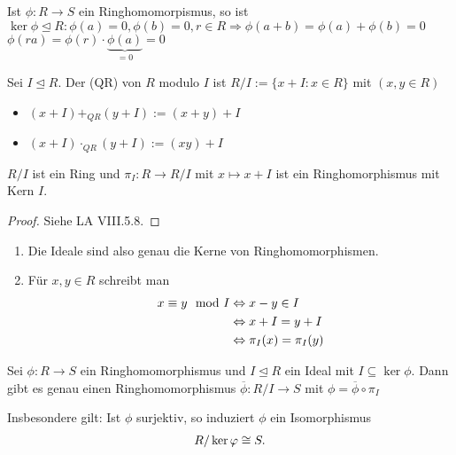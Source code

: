 \begin{example}
	Ist $\phi: R \to S$ ein Ringhomomorpismus, so ist $\ker \phi \unlhd R : \phi(a) = 0, \phi(b) = 0, r \in R \Rightarrow \phi(a+b) = \phi(a) + \phi(b) = 0$\\
	$\phi(ra) = \phi(r)\cdot \underbrace{\phi(a)}_{=0} = 0$
\end{example}

\begin{definition}[Quotientenring] 
	Sei $I \unlhd R$. Der  (QR) von $R$ modulo $I$ ist $R/I := \{x + I \colon x \in R\}$
	mit $(x, y \in R)$
	\begin{itemize}
		\item $(x+ I) +_{QR} (y+I) := (x+y) +I$
		\item $(x+I) \cdot_{QR} (y+I) := (xy) +I$
	\end{itemize}
\end{definition}

\begin{proposition}
	$R/I$ ist ein Ring und $\pi_I : R \to R/I$ mit $x \mapsto x +I$ ist ein Ringhomorphismus mit Kern $I$.
\end{proposition}

\begin{proof}
	Siehe LA VIII.5.8.
\end{proof}

\begin{remark}
	\begin{enumerate}
		\item Die Ideale sind also genau die Kerne von Ringhomomorphismen.
		\item Für $x,y \in R$ schreibt man
		\begin{align}
			x \equiv y \mod I &\Leftrightarrow x - y \in I\notag \\
			&\Leftrightarrow x+I = y+I\notag \\
			&\Leftrightarrow \pi_I(x) = \pi_I(y) \notag
		\end{align}
	\end{enumerate}
\end{remark}

\begin{proposition}[Homomorphiesatz]
	Sei $\phi: R \to S$ ein Ringhomomorphismus und $I \unlhd R$ ein Ideal mit $I \subseteq \ker \phi$. Dann gibt es genau einen Ringhomomorphismus $\overline{\phi}:R/I \to S$ mit $\phi = \overline{\phi}\circ \pi_I$
		\begin{center}
	\end{center}
	Insbesondere gilt: Ist $\phi$ surjektiv, so induziert $\phi$ ein Isomorphismus
	\begin{align}
		R / \ker \phi \cong S. \notag
	\end{align}
\end{proposition}

